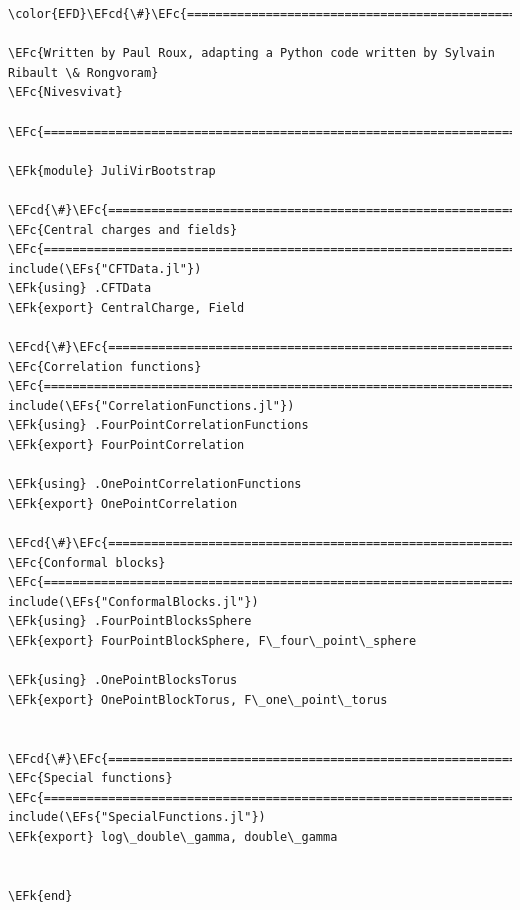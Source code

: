 \documentclass[a4paper]{article}
\numberwithin{equation}{section}
\newcommand{\EFc}[1]{\textcolor{EFc}{#1}} %
\newcommand{\EFcd}[1]{\textcolor{EFcd}{#1}} %
\newcommand{\EFs}[1]{\textcolor{EFs}{#1}} %
\newcommand{\EFk}[1]{\textcolor{EFk}{#1}} %
\begin{document}
\begin{Code}
\begin{Verbatim}
\color{EFD}\EFcd{\#}\EFc{===========================================================================================}

\EFc{Written by Paul Roux, adapting a Python code written by Sylvain Ribault \& Rongvoram}
\EFc{Nivesvivat}

\EFc{===========================================================================================\#}

\EFk{module} JuliVirBootstrap

\EFcd{\#}\EFc{===========================================================================================}
\EFc{Central charges and fields}
\EFc{===========================================================================================\#}
include(\EFs{"CFTData.jl"})
\EFk{using} .CFTData
\EFk{export} CentralCharge, Field

\EFcd{\#}\EFc{===========================================================================================}
\EFc{Correlation functions}
\EFc{===========================================================================================\#}
include(\EFs{"CorrelationFunctions.jl"})
\EFk{using} .FourPointCorrelationFunctions
\EFk{export} FourPointCorrelation

\EFk{using} .OnePointCorrelationFunctions
\EFk{export} OnePointCorrelation

\EFcd{\#}\EFc{===========================================================================================}
\EFc{Conformal blocks}
\EFc{===========================================================================================\#}
include(\EFs{"ConformalBlocks.jl"})
\EFk{using} .FourPointBlocksSphere
\EFk{export} FourPointBlockSphere, F\_four\_point\_sphere

\EFk{using} .OnePointBlocksTorus
\EFk{export} OnePointBlockTorus, F\_one\_point\_torus


\EFcd{\#}\EFc{===========================================================================================}
\EFc{Special functions}
\EFc{===========================================================================================\#}
include(\EFs{"SpecialFunctions.jl"})
\EFk{export} log\_double\_gamma, double\_gamma


\EFk{end}
\end{Verbatim}
\end{Code}
\end{document}
